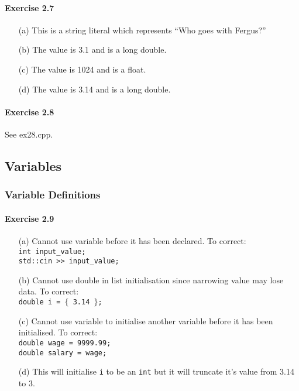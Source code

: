 \paragraph{Exercise 2.7}
\begin{itemize}
	\item [(a)]
		This is a string literal which represents ``Who goes with Fergus?''
	\item [(b)]
		The value is 3.1 and is a long double.
	\item [(c)]
		The value is 1024 and is a float.
	\item [(d)]
		The value is 3.14 and is a long double.
\end{itemize}

\paragraph{Exercise 2.8}
See ex28.cpp.

\subsection{Variables}

\subsubsection{Variable Definitions}

\paragraph{Exercise 2.9}
\begin{itemize}
	\item [(a)]
		Cannot use variable before it has been declared. To correct:\\
		\texttt{int input\_value;}\\
		\texttt{std::cin >> input\_value;}
	\item [(b)]
		Cannot use double in list initialisation since narrowing value may lose data. To correct:\\
		\texttt{double i = $\{$ 3.14 $\}$;}
	\item [(c)]
		Cannot use variable to initialise another variable before it has been initialised. To correct:\\
		\texttt{double wage = 9999.99;}\\
		\texttt{double salary = wage;}
	\item [(d)]
		This will initialise \texttt{i} to be an \texttt{int} but it will truncate it's value from 3.14 to 3.
\end{itemize}

